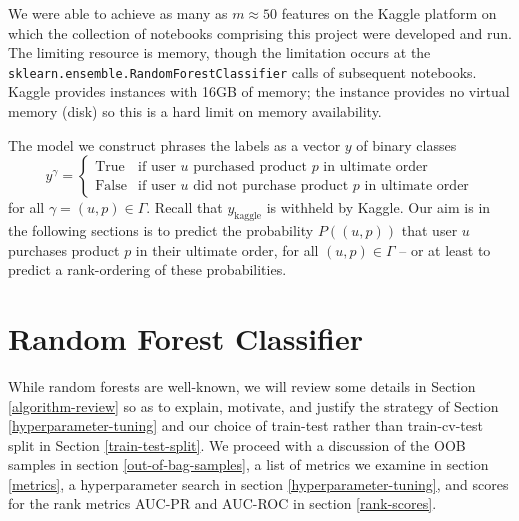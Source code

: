 \documentclass[11pt]{article}
\theoremstyle{definition}
\numberwithin{equation}{section}
\begin{document}
We were able to achieve as many as \(m \approx 50\) features on the Kaggle platform on
which the collection of notebooks comprising this project were developed
and run. The limiting resource is memory, though the limitation occurs at
the \texttt{sklearn.ensemble.RandomForestClassifier} calls of subsequent
notebooks. Kaggle provides instances with 16GB of memory; the
instance provides no virtual memory (disk) so this is a hard limit on
memory availability.


The model we construct phrases the labels as a vector \(y\) of binary classes
\begin{equation}
  y^\gamma =
  \begin{cases}
    \text{True}  & \text{if user $u$ purchased product $p$ in ultimate order}        \\
    \text{False} & \text{if user $u$ did not purchase product $p$ in ultimate order}
  \end{cases}
\end{equation} for all \(\gamma = (u, p) \in \Gamma\). Recall that
$y_\text{kaggle} $ is withheld by Kaggle.
Our aim is in the following sections is to predict the probability
\(P((u, p))\) that user \(u\) purchases product \(p\) in their ultimate
order, for all \((u, p) \in \Gamma\) -- or at least to predict a
rank-ordering of these probabilities.



\hypertarget{random-forest-classifier}{%
  \section{Random Forest Classifier}\label{random-forest-classifier}}

While random forests are well-known, we will review some details in Section \ref{algorithm-review}
so as to explain, motivate, and justify the strategy of
Section \ref{hyperparameter-tuning} and our choice of train-test
rather than train-cv-test split in Section \ref{train-test-split}.
We proceed with a discussion of the OOB samples in section \ref{out-of-bag-samples},
a list of metrics we examine in section \ref{metrics},
a hyperparameter search in section \ref{hyperparameter-tuning},
and scores for the rank metrics AUC-PR and AUC-ROC in section \ref{rank-scores}.
\end{document}
